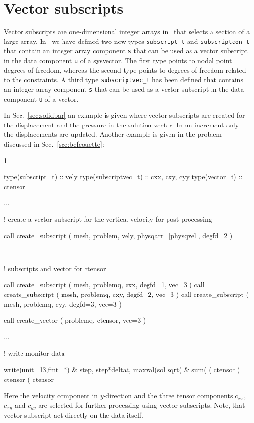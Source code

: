 \section{Vector subscripts}
\label{sec:vectorsubscript}

Vector subscripts are one-dimensional integer arrays in \ftn\ 
that selects a section of a large array. In \tfem\ we have defined two
new types
\texttt{subscript\_t} and \texttt{subscriptcon\_t} 
that contain an
integer array component \texttt{s} that can be used as a vector subscript in
the data component \texttt{u} of a sysvector. The first type points to
nodal point degrees of freedom, whereas the second type points to
degrees of freedom related to the constraints.
A third type \texttt{subscriptvec\_t} has been defined
that contains an
integer array component \texttt{s} that can be used as a vector subscript in
the data component \texttt{u} of a vector.

In Sec.~\ref{sec:solidbar} an example is given where vector subscripts are
created for the displacement and the pressure in the solution vector. In an
increment only the displacements are updated. Another example is given in
the problem discussed in Sec.~\ref{sec:bcfcouette}:
\begin{listing}{1}

  type(subscript_t) :: vely
  type(subscriptvec_t) :: cxx, cxy, cyy
  type(vector_t) :: ctensor

  ...

! create a vector subscript for the vertical velocity for post processing

  call create_subscript ( mesh, problem, vely, physqarr=[physqvel], degfd=2 )

  ...

! subscripts and vector for ctensor

  call create_subscript ( mesh, problemq, cxx, degfd=1, vec=3 )
  call create_subscript ( mesh, problemq, cxy, degfd=2, vec=3 )
  call create_subscript ( mesh, problemq, cyy, degfd=3, vec=3 )

  call create_vector ( problemq, ctensor, vec=3 )

  ...

!  write monitor data

   write(unit=13,fmt=*) &
     step, step*deltat, maxval(sol%
     sqrt( &
     sum( ( ctensor%
          ( ctensor%
          ( ctensor%

\end{listing}
Here the velocity component in $y$-direction and the three tensor components
$c_{xx}$, $c_{xy}$ and $c_{yy}$ are selected for further processing using
vector subscripts. Note, that vector subscript act directly on the data itself.

